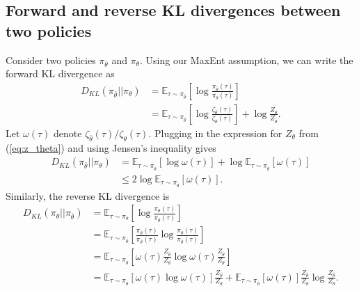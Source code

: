 \subsection{Forward and reverse KL divergences between two policies}
\label{a:kl_is}
Consider two policies $\pi_{\bar\theta}$ and $\pi_{\theta}$. Using our MaxEnt assumption, we can write the forward KL divergence as
\begin{equation}
\begin{split}
    D_{KL}(\pi_{\bar\theta}\vert\vert\pi_\theta)
    &= \mathbb{E}_{\tau\sim\pi_{\bar\theta}} \left[ \log\frac{\pi_{\bar{\theta}}(\tau)}{\pi_\theta(\tau)}\right]\\
    &= \mathbb{E}_{\tau\sim\pi_{\bar\theta}} \left[ \log\frac{\zeta_{\bar{\theta}}(\tau)}{\zeta_\theta(\tau)}\right]+\log\frac{Z_\theta}{Z_{\bar{\theta}}}.
\end{split}
\end{equation}
Let $\omega(\tau)$ denote $\zeta_{\bar{\theta}}(\tau)/\zeta_\theta(\tau)$. Plugging in the expression for $Z_\theta$ from (\ref{eq:z_theta}) and using Jensen's inequality gives
\begin{equation}
\begin{split}
    D_{KL}(\pi_{\bar\theta}\vert\vert\pi_\theta)
    &= \mathbb{E}_{\tau\sim\pi_{\bar\theta}} \left[ \log\omega(\tau)\right] + \log \mathbb{E}_{\tau\sim\pi_{\bar\theta}}\left[\omega(\tau)\right]\\
    &\leq 2\log \mathbb{E}_{\tau\sim\pi_{\bar\theta}}\left[\omega(\tau)\right].
\end{split}
\end{equation}
Similarly, the reverse KL divergence is
\begin{equation}
\begin{split}
    D_{KL}(\pi_{\theta}\vert\vert\pi_{\bar\theta})
    &= \mathbb{E}_{\tau\sim\pi_{\theta}} \left[ \log\frac{\pi_{\theta}(\tau)}{\pi_{\bar\theta}(\tau)}\right]\\
    &= \mathbb{E}_{\tau\sim\pi_{\bar\theta}} \left[\frac{\pi_{\theta}(\tau)}{\pi_{\bar\theta}(\tau)}\log\frac{\pi_{\theta}(\tau)}{\pi_{\bar\theta}(\tau)}\right]\\
    &= \mathbb{E}_{\tau\sim\pi_{\bar\theta}} \left[\omega(\tau)\frac{Z_{\bar\theta}}{Z_\theta}\log\omega(\tau)\frac{Z_{\bar\theta}}{Z_{\theta}}\right]\\
    &= \mathbb{E}_{\tau\sim\pi_{\bar\theta}} \left[\omega(\tau)\log\omega(\tau)\right]\frac{Z_{\bar\theta}}{Z_\theta} + \mathbb{E}_{\tau\sim\pi_{\bar\theta}} \left[\omega(\tau)\right]\frac{Z_{\bar\theta}}{Z_\theta}\log\frac{Z_{\bar\theta}}{Z_{\theta}}.\\
\end{split}
\end{equation}
